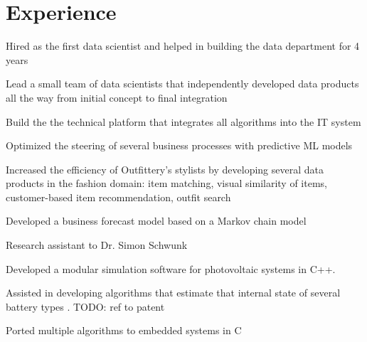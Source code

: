 \documentclass[]{deedy-resume-openfont}
\begin{document}
\begin{minipage}[t]{0.62\textwidth} 


\section{Experience}

\vspace{12pt} %
\begin{tightemize}
\item Hired as the first data scientist and helped in building the data department for 4 years
\item Lead a small team of data scientists that independently developed data products all the way from initial concept to final integration
\item Build the the technical platform that integrates all algorithms into the IT system
\item Optimized the steering of several business processes with predictive ML models
\item Increased the efficiency of Outfittery's stylists by developing several data products in the fashion domain: item matching, visual similarity of items, customer-based item recommendation, outfit search
\item Developed a business forecast model based on a Markov chain model
\end{tightemize}
\sectionsep


\begin{tightemize}
\item Research assistant to Dr. Simon Schwunk
\item Developed a modular simulation software for photovoltaic systems in C++.
\item Assisted in developing algorithms that estimate that internal state of several battery types . TODO: ref to patent
\item Ported multiple algorithms to embedded systems in C
\end{tightemize}
\sectionsep



\end{minipage}
\end{document}
